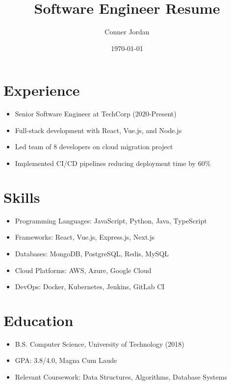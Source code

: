 \documentclass{article}
\title{Software Engineer Resume}
\author{Conner Jordan}
\date{\today}
\begin{document}
\maketitle

\section{Experience}
\begin{itemize}
    \item[•] Senior Software Engineer at TechCorp (2020-Present)
    \item[•] Full-stack development with React, Vue.js, and Node.js
    \item[•] Led team of 8 developers on cloud migration project
    \item[•] Implemented CI/CD pipelines reducing deployment time by 60\%
\end{itemize}

\section{Skills}
\begin{itemize}
    \item[•] Programming Languages: JavaScript, Python, Java, TypeScript
    \item[•] Frameworks: React, Vue.js, Express.js, Next.js
    \item[•] Databases: MongoDB, PostgreSQL, Redis, MySQL
    \item[•] Cloud Platforms: AWS, Azure, Google Cloud
    \item[•] DevOps: Docker, Kubernetes, Jenkins, GitLab CI
\end{itemize}

\section{Education}
\begin{itemize}
    \item[•] B.S. Computer Science, University of Technology (2018)
    \item[•] GPA: 3.8/4.0, Magna Cum Laude
    \item[•] Relevant Coursework: Data Structures, Algorithms, Database Systems
\end{itemize}
\end{document}
